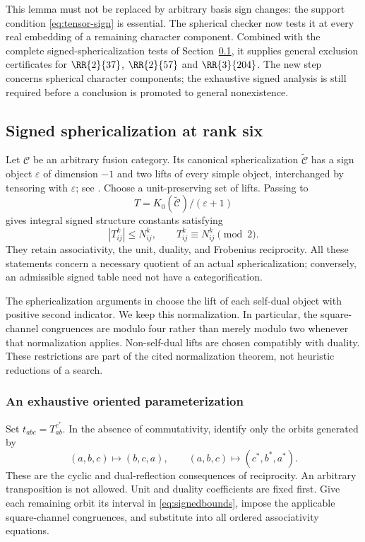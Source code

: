 This lemma must not be replaced by arbitrary basis sign changes: the
support condition \eqref{eq:tensor-sign} is essential. The spherical
checker now tests it at every real embedding of a remaining character
component. Combined with the complete signed-sphericalization tests of Section~\ref{sec:signed}, it supplies general exclusion certificates
for $\RR{2}{37}$, $\RR{2}{57}$ and $\RR{3}{204}$. The new step concerns
spherical character components; the exhaustive signed analysis is still
required before a conclusion is promoted to general nonexistence.

\subsection{Signed sphericalization at rank six}\label{sec:signed}
Let $\mathcal C$ be an arbitrary fusion category. Its canonical
sphericalization $\widetilde{\mathcal C}$ has a sign object
$\varepsilon$ of dimension $-1$ and two lifts of every simple object,
interchanged by tensoring with $\varepsilon$; see
\cite{ENO,Ostrik3}. Choose a unit-preserving set of lifts. Passing to
\[
T=K_0(\widetilde{\mathcal C})/(\varepsilon+1)
\]
gives integral signed structure constants satisfying
\begin{equation}\label{eq:signedbounds}
 |T_{ij}^{k}|\le N_{ij}^{k},\qquad
 T_{ij}^{k}\equiv N_{ij}^{k}\pmod2.
\end{equation}
They retain associativity, the unit, duality, and Frobenius reciprocity.
All these statements concern a necessary quotient of an actual
sphericalization; conversely, an admissible signed table need not have a
categorification.

The sphericalization arguments in \cite{DP4,DP5} choose the lift of each
self-dual object with positive second indicator. We keep this normalization.
In particular, the square-channel congruences are modulo four rather
than merely modulo two whenever that normalization applies. Non-self-dual
lifts are chosen compatibly with duality. These restrictions are part of
the cited normalization theorem, not heuristic reductions of a search.

\subsubsection{An exhaustive oriented parameterization}
Set $t_{abc}=T_{ab}^{c^*}$. In the absence of commutativity, identify
only the orbits generated by
\begin{equation}\label{eq:orbits}
(a,b,c)\longmapsto(b,c,a),\qquad
(a,b,c)\longmapsto(c^*,b^*,a^*).
\end{equation}
These are the cyclic and dual-reflection consequences of reciprocity.
An arbitrary transposition is not allowed. Unit and duality coefficients
are fixed first. Give each remaining orbit its interval in
\eqref{eq:signedbounds}, impose the applicable square-channel
congruences, and substitute into all ordered associativity equations.

